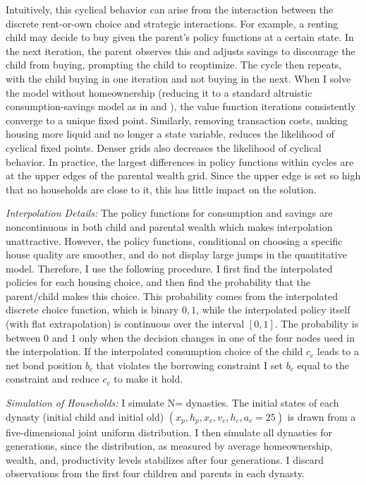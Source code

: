 \documentclass[12pt]{article}
\begin{document}
Intuitively, this cyclical behavior can arise from the interaction between the discrete rent-or-own choice and strategic interactions. For example, a renting child may decide to buy given the parent's policy functions at a certain state. In the next iteration, the parent observes this and adjusts savings to discourage the child from buying, prompting the child to reoptimize. The cycle then repeats, with the child buying in one iteration and not buying in the next. When I solve the model without homeownership (reducing it to a standard altruistic consumption-savings model as in \cite{Barczyk2020a} and \cite{Chu2020}), the value function iterations consistently converge to a unique fixed point. Similarly, removing transaction costs, making housing more liquid and no longer a state variable, reduces the likelihood of cyclical fixed points. Denser grids also decreases the likelihood of cyclical behavior. In practice, the largest differences in policy functions within cycles are at the upper edges of the parental wealth grid. Since the upper edge is set so high that no households are close to it, this has little impact on the solution.

\textit{Interpolation Details:} The policy functions for consumption and savings are noncontinuous in both child and parental wealth which makes interpolation unattractive. However, the policy functions, conditional on choosing a specific house quality are smoother, and do not display large jumps in the quantitative model. Therefore, I use the following procedure. I first find the interpolated policies for each housing choice, and then find the probability that the parent/child makes this choice. This probability comes from the interpolated discrete choice function, which is binary ${0,1}$, while the interpolated policy itself (with flat extrapolation) is continuous over the interval $[0,1]$. The probability is between 0 and 1 only when the decision changes in one of the four nodes used in the interpolation. If the interpolated consumption choice of the child $c_c$ leads to a net bond position $b_c$ that violates the borrowing constraint I set $b_c$ equal to the constraint and reduce $c_c$ to make it hold. 


\textit{Simulation of Households:} 
I simulate N={\parNdyn} dynasties. The initial states of each dynasty (initial child and initial old) $(x_p,h_p,x_c,v_c,h_c,a_c=25)$ is drawn from a five-dimensional joint uniform distribution. I then simulate all dynasties for {\parNdyn} generations, since the distribution, as measured by average homeownership, wealth, and, productivity levels stabilizes after four generations. I discard observations from the first four children and parents in each dynasty.
\end{document}
